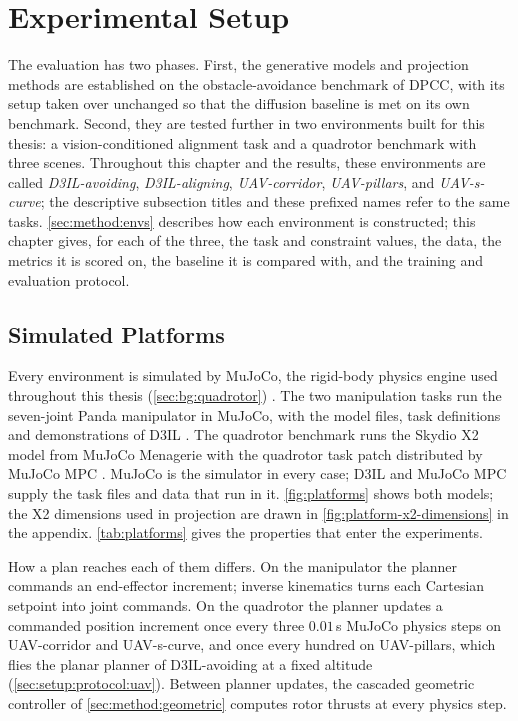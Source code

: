 \chapter{Experimental Setup}\label{ch:setup}

The evaluation has two phases. First, the generative models and projection methods are established on
the obstacle-avoidance benchmark of \ac{DPCC}, with its setup taken over unchanged so that the diffusion
baseline is met on its own benchmark. Second, they are tested further in two environments built for
this thesis: a vision-conditioned alignment task and a quadrotor benchmark with three scenes.
Throughout this chapter and the results, these environments are called \emph{D3IL-avoiding},
\emph{D3IL-aligning}, \emph{UAV-corridor}, \emph{UAV-pillars}, and \emph{UAV-s-curve}; the descriptive
subsection titles and these prefixed names refer to the same tasks. \autoref{sec:method:envs} describes how each environment is constructed; this
chapter gives, for each of the three, the task and constraint values, the data, the metrics it is scored
on, the baseline it is compared with, and the training and evaluation protocol.

\section{Simulated Platforms}\label{sec:setup:platforms}

Every environment is simulated by MuJoCo, the rigid-body physics engine used throughout this thesis
(\autoref{sec:bg:quadrotor}) \parencite{todorov2012mujoco}. The two
manipulation tasks run the seven-joint Panda manipulator in MuJoCo, with the model files, task
definitions and demonstrations of D3IL \parencite{jia2024towards}. The quadrotor benchmark runs the Skydio X2 model from MuJoCo Menagerie
\parencite{zakka2022menagerie} with the quadrotor task patch distributed by MuJoCo MPC
\parencite{howell2022predictive}. MuJoCo is the simulator in every case; D3IL and MuJoCo MPC supply the
task files and data that run in it. \autoref{fig:platforms} shows both models; the X2 dimensions used
in projection are drawn in \autoref{fig:platform-x2-dimensions} in the appendix.
\autoref{tab:platforms} gives the properties that enter the experiments.

How a plan reaches each of them differs. On the manipulator the planner commands an end-effector
increment; inverse kinematics turns each Cartesian setpoint into joint commands. On the quadrotor the
planner updates a commanded position increment once every three $0.01$\,s MuJoCo physics steps on
UAV-corridor and UAV-s-curve, and once every hundred on UAV-pillars, which flies the planar planner of
D3IL-avoiding at a fixed altitude (\autoref{sec:setup:protocol:uav}).
Between planner updates, the cascaded geometric controller of \autoref{sec:method:geometric}
computes rotor thrusts at every physics step.

